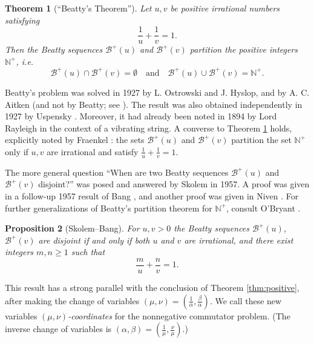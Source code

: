 \documentclass[11pt, letterpaper, reqno]{amsart}
\newtheorem{thm}{Theorem}[section]
\newtheorem{prop}[thm]{Proposition}
\theoremstyle{definition}
\numberwithin{equation}{section}
\newcommand{\NN}{\mathbb{N}}
\newcommand{\sB}{\mathcal{B}}
\newcommand{\um}{{\mu}}
\newcommand{\vm}{{\nu}}
\begin{document}
\begin{thm}[``Beatty's Theorem'']
\label{thm:20} 
Let $u, v$ be positive irrational numbers 
satisfying 
$$
\frac{1}{u} + \frac{1}{v} =1.
$$
Then the Beatty sequences $\sB^{+}(u)$ and $\sB^{+}(v)$
partition the positive integers $\NN^{+}$, i.e.
$$
\sB^{+}(u) \cap \sB^{+}(v) = \emptyset \quad \mbox{and} \quad \sB^{+}(u) \cup \sB^{+}(v) = \NN^{+}.
$$
\end{thm}

Beatty's problem was solved in 1927  by L. Ostrowski and J. Hyslop, 
and by A. C. Aitken (and not by Beatty;  see \cite{Bea26}). 
The result was  also obtained independently in 1927 by Uspensky \cite{Usp27}.
Moreover,  it  had already been  noted in 1894 by Lord Rayleigh \cite[p.122]{Rayleigh:1894}
in the context of a vibrating string.
A converse to Theorem \ref{thm:20} holds, explicitly noted by Fraenkel \cite[p. 6]{Fra69}:
 the sets $\sB^{+}(u)$ and $\sB^{+}(v)$ partition the
set $\NN^{+}$ only if $u, v$ are irrational and satisfy $\frac{1}{u} + \frac{1}{v} =1$. 


The more general question  ``When are two Beatty sequences $\sB^{+}(u)$ and $\sB^{+}(v)$ disjoint?''
was posed and answered by Skolem \cite[Theorem 8]{Sko57} in 1957.
A proof  was given in a  follow-up 1957 result of Bang \cite[Theorem 9]{Ban57},
and another proof was given in  Niven \cite[Theorem 3.11]{Niven:63}.
For  further  generalizations of Beatty's
partition theorem for $\NN^{+}$, consult O'Bryant \cite{OB03}.

\begin{prop}[Skolem--Bang]
\label{prop:disjoint-Beatty}
For $u, v >0$ the Beatty sequences $\sB^{+}(u)$, $\sB^{+}(v)$ are disjoint 
   if and only if both $u$ and $v$ are irrational, and there exist integers $m,n \geq 1$ such that
\begin{equation}\label{eqn:Beatty-disjoint}
\frac{m}{u} + \frac{n}{v} = 1.
\end{equation}
\end{prop}

This result has a strong parallel with the 
conclusion of Theorem \ref{thm:positive}, 
after making the
change of variables $(\um,\vm)= (\frac{1}{\alpha}, \frac{\beta}{\alpha})$.
We call these new variables {\em $(\um,\vm)$-coordinates} for the nonnegative commutator problem.
(The inverse change of variables is $(\alpha, \beta) = (\frac{1}{\um}, \frac{\vm}{\um})$.)
\end{document}
